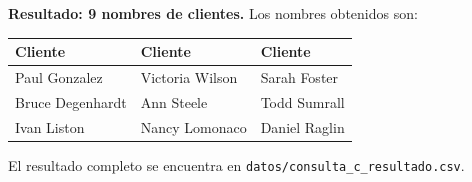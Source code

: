 \textbf{Resultado: 9 nombres de clientes.} Los nombres obtenidos son:

\begin{center}
\small
\begin{tabular}{lll}
\toprule
\rowcolor{Fondo}
Cliente & Cliente & Cliente\\
\midrule
Paul Gonzalez & Victoria Wilson & Sarah Foster\\
Bruce Degenhardt & Ann Steele & Todd Sumrall\\
Ivan Liston & Nancy Lomonaco & Daniel Raglin\\
\bottomrule
\end{tabular}
\end{center}

El resultado completo se encuentra en \texttt{datos/consulta\_c\_resultado.csv}.

\begin{center}
\begin{minipage}{.48\linewidth}
\end{minipage}
\hfill
\begin{minipage}{.48\linewidth}
\end{minipage}
\end{center}